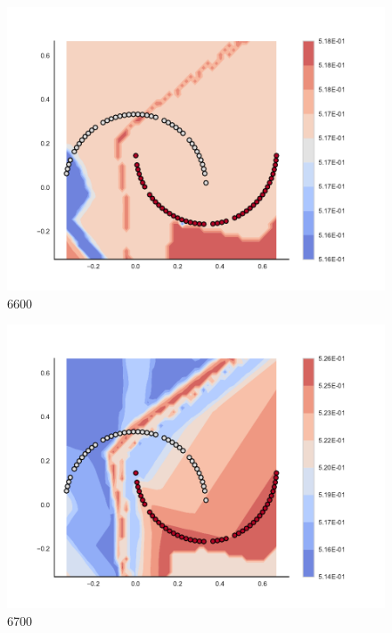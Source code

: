 \begin{subfigure}[b]{0.09\textwidth}
    \includegraphics[clip, trim=2.35cm 1.75cm 4.5cm 0cm,width=\textwidth]{img/convergence/6600.pdf}
    \caption{6600}
    \label{fig:convergence_6600}
\end{subfigure}
%
\begin{subfigure}[b]{0.09\textwidth}
    \includegraphics[clip, trim=2.35cm 1.75cm 4.5cm 0cm,width=\textwidth]{img/convergence/6700.pdf}
    \caption{6700}
    \label{fig:convergence_6700}
\end{subfigure}
%
